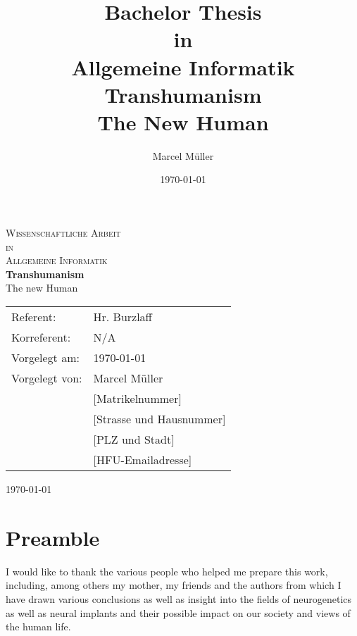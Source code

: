 \documentclass[
      12pt,
      a4paper,
      cleardoublepage=empty,
      final,
      twoside
        ]{scrbook}
\title{\fontsize{14}{14}Bachelor Thesis \\ in \\Allgemeine Informatik
\fontsize{22}{22}\textbf{Transhumanism}\\
\fontsize{18}{18} The New Human}
\author{Marcel M\"uller}
\date{\today}
\begin{document}
\setcounter{secnumdepth}{3}


\begin{titlepage}
\begin{center}


\fontsize{18}{18}
\textsc{Wissenschaftliche Arbeit \\[0.5cm] in \\[0.5cm] Allgemeine Informatik}\\[1.5cm]

\fontsize{22}{22}
{ \bfseries Transhumanism \\[0.4cm] }
\fontsize{18}{18}
{ The new Human\\[10cm] }

\begin{tabular}{l l}
   Referent:  & Hr. Burzlaff \\
   Korreferent: & N/A\\
   Vorgelegt am: & \today\\ %
   Vorgelegt von: & Marcel M\"uller\\
   & [Matrikelnummer] \\
   & [Strasse und Hausnummer] \\
   & [PLZ und Stadt] \\
   & [HFU-Emailadresse]\\
\end{tabular}

\vfill

{\large \today}

\end{center}
\end{titlepage}

\frontmatter

\section{Preamble}

\begin{par}
  
  I would like to thank the various people who helped me prepare this work, including, among others my mother, my friends and the authors from which I have drawn various conclusions as well as insight into the fields of neurogenetics as well as neural implants and their possible impact on our society and views of the human life.
  
\end{par}

\newpage
\end{document}
